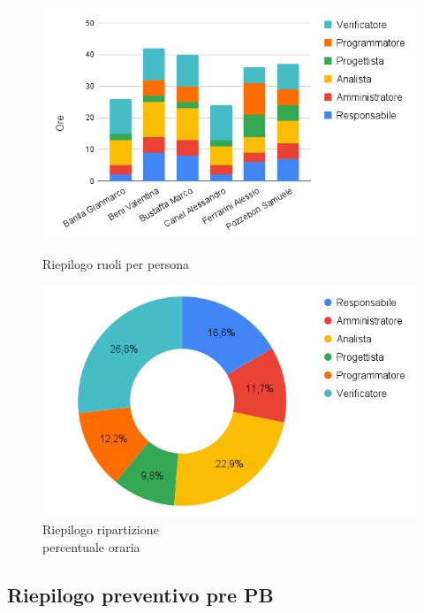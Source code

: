 \begin{figure}[h!]
	\centering
	\begin{minipage}[c]{0.40\textwidth}
    	\includegraphics[scale=0.42]{../../assets/Diagrammi_Excel/person_tot.png}
		\caption{Riepilogo ruoli per persona}
	\end{minipage}
\hfill
	\begin{minipage}[c]{0.46\textwidth}
		\includegraphics[scale=0.38]{../../assets/Diagrammi_Excel/torta_tot.png}
		\caption{Riepilogo ripartizione\\ percentuale oraria}
	\end{minipage}
\end{figure}
\newpage

\subsection{Riepilogo preventivo pre PB}

